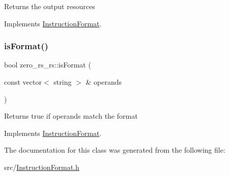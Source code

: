 Returns the output resources 

Implements \hyperlink{classInstructionFormat_a95cd28ffb1bde59b67f676880ab10536}{Instruction\+Format}.

\mbox{\label{classzero__rs__rs_a0a3cc74b189c29a3665a4ab80e3b0aba}} 
\subsubsection{\texorpdfstring{is\+Format()}{isFormat()}}
{\footnotesize\ttfamily bool zero\+\_\+rs\+\_\+rs\+::is\+Format (\begin{DoxyParamCaption}\item[{const vector$<$ string $>$ \&}]{operands }\end{DoxyParamCaption})\hspace{0.3cm}{\ttfamily [virtual]}}

Returns true if operands match the format 

Implements \hyperlink{classInstructionFormat_a9fdcf94dcd7d9a55ba86e7a63f04d1fe}{Instruction\+Format}.



The documentation for this class was generated from the following file\+:\begin{DoxyCompactItemize}
\item 
src/\hyperlink{InstructionFormat_8h}{Instruction\+Format.\+h}\end{DoxyCompactItemize}
